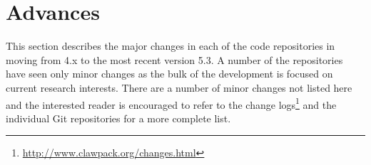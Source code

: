 %
%
%

\section{Advances} \label{sec:advances}

This section describes the major changes in each of the code repositories
in moving from \clawpack 4.x to the most recent version 5.3.
A number of the repositories have seen only minor changes as the bulk of the
development is focused on current research interests.  There are a number of
minor changes not listed here and the interested reader is encouraged to refer
to the change logs\footnote{\url{http://www.clawpack.org/changes.html}} and the
individual \clawpack Git repositories for a more complete list.









